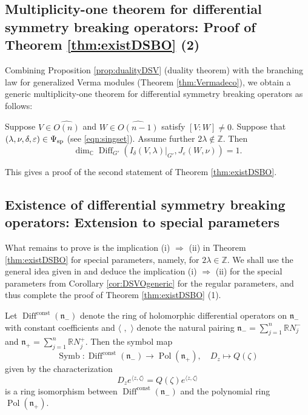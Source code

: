 \subsection{Multiplicity-one theorem for differential symmetry breaking operators: Proof of Theorem \ref{thm:existDSBO} (2)}
\label{subsec:mfDiff}
Combining Proposition \ref{prop:dualityDSV} (duality theorem)
 with the branching law
 for generalized Verma modules
 (Theorem \ref{thm:Vermadeco}), 
 we obtain a 
generic multiplicity-one theorem
 for differential symmetry breaking operators
 as follows:
\begin{corollary}
\label{cor:DSVOgeneric}
Suppose $V \in \widehat {O(n)}$ and $W \in \widehat{O(n-1)}$
 satisfy $[V:W] \ne 0$.  
Suppose that $(\lambda, \nu, \delta, \varepsilon) \in \Psi_{{\operatorname{sp}}}$
 (see \eqref{eqn:singset}).  
Assume further $2 \lambda \not \in {\mathbb{Z}}$.  
Then 
\[
   \dim_{\mathbb{C}} 
   {\operatorname{Diff}}_{G'}
   (I_{\delta}(V,\lambda)|_{G'},J_{\varepsilon}(W,\nu))
   =1. 
\]
\end{corollary}
This gives a proof of the second statement
 of Theorem \ref{thm:existDSBO}.  

\subsection{Existence of differential symmetry breaking operators:
Extension to special parameters}
\label{subsec:extDiff}
What remains to prove is the implication (i) $\Rightarrow$ (ii)
 in Theorem \ref{thm:existDSBO}
 for special parameters,
 namely,
 for $2 \lambda \in {\mathbb{Z}}$.  
We shall use the general idea given in \cite[Lem.~11.10]{sbon}
 and deduce the implication (i) $\Rightarrow$ (ii)
 for the special parameters from Corollary \ref{cor:DSVOgeneric}
 for the regular parameters,  
 and thus complete the proof of Theorem \ref{thm:existDSBO} (1).  



Let ${\operatorname{Diff}}^{\operatorname{const}}({\mathfrak{n}}_{-})$
 denote the ring of holomorphic differential operators
 on ${\mathfrak{n}}_{-}$
 with constant coefficients
 and $\langle \,\, , \,\, \rangle$ denote the natural pairing 
 ${\mathfrak{n}}_-=\sum_{j=1}^{n}{\mathbb{R}} N_j^-$
 and ${\mathfrak{n}}_+=\sum_{j=1}^{n}{\mathbb{R}} N_j^+$.  
Then the symbol map
\[
  {\operatorname{Symb}} \colon 
  {\operatorname{Diff}}^{\operatorname{const}}({\mathfrak{n}}_{-})
  \to 
  {\operatorname{Pol}}({\mathfrak{n}}_{+}), 
  \quad
  D_z \mapsto Q(\zeta)
\]
 given by the characterization
\[
   D_z e^{\langle z, \zeta \rangle}
   =
   Q(\zeta) e^{\langle z, \zeta \rangle}
\]
 is a ring isomorphism 
 between ${\operatorname{Diff}}^{\operatorname{const}}({\mathfrak{n}}_{-})$
 and the polynomial ring ${\operatorname{Pol}}({\mathfrak{n}}_{+})$.  



